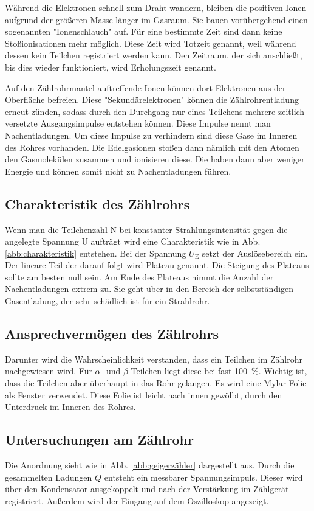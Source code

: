 Während die Elektronen schnell zum Draht wandern, bleiben die positiven Ionen aufgrund der größeren Masse länger im Gasraum. Sie bauen vorübergehend einen sogenannten "Ionenschlauch" auf. Für eine bestimmte Zeit sind dann keine Stoßionisationen mehr möglich. Diese Zeit wird Totzeit genannt, weil während dessen kein Teilchen registriert werden kann. 
Den Zeitraum, der sich anschließt, bis dies wieder funktioniert, wird Erholungszeit genannt. 

Auf den Zählrohrmantel auftreffende Ionen können dort Elektronen aus der Oberfläche befreien. Diese "Sekundärelektronen" können die Zählrohrentladung erneut zünden, sodass durch den Durchgang nur eines Teilchens mehrere zeitlich versetzte Ausgangsimpulse entstehen können. 
Diese Impulse nennt man Nachentladungen. 
Um diese Impulse zu verhindern sind diese Gase im Inneren des Rohres vorhanden. Die Edelgasionen stoßen dann nämlich mit den Atomen den Gasmolekülen zusammen und ionisieren diese. Die haben dann aber weniger Energie und können somit nicht zu Nachentladungen führen. 


\subsection{Charakteristik des Zählrohrs}

Wenn man die Teilchenzahl N bei konstanter Strahlungsintensität gegen die angelegte Spannung U aufträgt wird eine Charakteristik wie in Abb. \ref{abb:charakteristik} entstehen. Bei der Spannung $U_\text{E}$ setzt der Auslösebereich ein. Der lineare Teil der darauf folgt wird Plateau genannt. Die Steigung des Plateaus sollte am besten null sein. Am Ende des Plateaus nimmt die Anzahl der Nachentladungen extrem zu. Sie geht über in den Bereich der selbstständigen Gasentladung, der sehr schädlich ist für ein Strahlrohr.

\subsection{Ansprechvermögen des Zählrohrs}

Darunter wird die Wahrscheinlichkeit verstanden, dass ein Teilchen im Zählrohr nachgewiesen wird. Für $\alpha$- und $\beta$-Teilchen liegt diese bei fast \SI{100}{\percent}. Wichtig ist, dass die Teilchen aber überhaupt in das Rohr gelangen. Es wird eine Mylar-Folie als Fenster verwendet. Diese Folie ist leicht nach innen gewölbt, durch den Unterdruck im Inneren des Rohres. 


\subsection{Untersuchungen am Zählrohr}

Die Anordnung sieht wie in Abb. \ref{abb:geigerzähler} dargestellt aus. Durch die gesammelten Ladungen $Q$ entsteht ein messbarer Spannungsimpuls. Dieser wird über den Kondensator ausgekoppelt und nach der Verstärkung im Zählgerät registriert. Außerdem wird der Eingang auf dem Oszilloskop angezeigt. 

